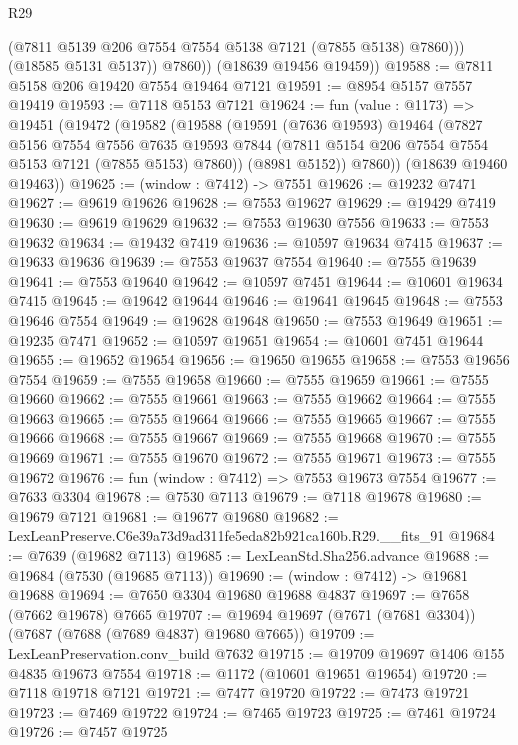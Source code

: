 \begin{lexlean}{R29}
\begin{coremodule}
                (@7811 @5139 @206 @7554 @7554 @5138 @7121 (@7855 @5138) @7860)))
            (@18585 @5131 @5137))
          @7860))
      (@18639 @19456 @19459))
@19588 := @7811 @5158 @206 @19420 @7554 @19464 @7121
@19591 := @8954 @5157 @7557 @19419
@19593 := @7118 @5153 @7121
@19624 := fun (value : @1173) =>
  @19451
    (@19472
      (@19582
        (@19588
          (@19591
            (@7636 @19593)
            @19464
            (@7827
              @5156
              @7554
              @7556
              @7635
              @19593
              @7844
              (@7811 @5154 @206 @7554 @7554 @5153 @7121 (@7855 @5153) @7860))
            (@8981 @5152))
          @7860))
      (@18639 @19460 @19463))
@19625 := (window : @7412) -> @7551
@19626 := @19232 @7471
@19627 := @9619 @19626
@19628 := @7553 @19627
@19629 := @19429 @7419
@19630 := @9619 @19629
@19632 := @7553 @19630 @7556
@19633 := @7553 @19632
@19634 := @19432 @7419
@19636 := @10597 @19634 @7415
@19637 := @19633 @19636
@19639 := @7553 @19637 @7554
@19640 := @7555 @19639
@19641 := @7553 @19640
@19642 := @10597 @7451
@19644 := @10601 @19634 @7415
@19645 := @19642 @19644
@19646 := @19641 @19645
@19648 := @7553 @19646 @7554
@19649 := @19628 @19648
@19650 := @7553 @19649
@19651 := @19235 @7471
@19652 := @10597 @19651
@19654 := @10601 @7451 @19644
@19655 := @19652 @19654
@19656 := @19650 @19655
@19658 := @7553 @19656 @7554
@19659 := @7555 @19658
@19660 := @7555 @19659
@19661 := @7555 @19660
@19662 := @7555 @19661
@19663 := @7555 @19662
@19664 := @7555 @19663
@19665 := @7555 @19664
@19666 := @7555 @19665
@19667 := @7555 @19666
@19668 := @7555 @19667
@19669 := @7555 @19668
@19670 := @7555 @19669
@19671 := @7555 @19670
@19672 := @7555 @19671
@19673 := @7555 @19672
@19676 := fun (window : @7412) => @7553 @19673 @7554
@19677 := @7633 @3304
@19678 := @7530 @7113
@19679 := @7118 @19678
@19680 := @19679 @7121
@19681 := @19677 @19680
@19682 := LexLeanPreserve.C6e39a73d9ad311fe5eda82b921ca160b.R29.__fits_91
@19684 := @7639 (@19682 @7113)
@19685 := LexLeanStd.Sha256.advance
@19688 := @19684 (@7530 (@19685 @7113))
@19690 := (window : @7412) -> @19681 @19688
@19694 := @7650 @3304 @19680 @19688 @4837
@19697 := @7658 (@7662 @19678) @7665
@19707 := @19694 @19697 (@7671 (@7681 @3304)) (@7687 (@7688 (@7689 @4837) @19680 @7665))
@19709 := LexLeanPreservation.conv_build @7632
@19715 := @19709 @19697 @1406 @155 @4835 @19673 @7554
@19718 := @1172 (@10601 @19651 @19654)
@19720 := @7118 @19718 @7121
@19721 := @7477 @19720
@19722 := @7473 @19721
@19723 := @7469 @19722
@19724 := @7465 @19723
@19725 := @7461 @19724
@19726 := @7457 @19725

\end{coremodule}
\end{lexlean}
